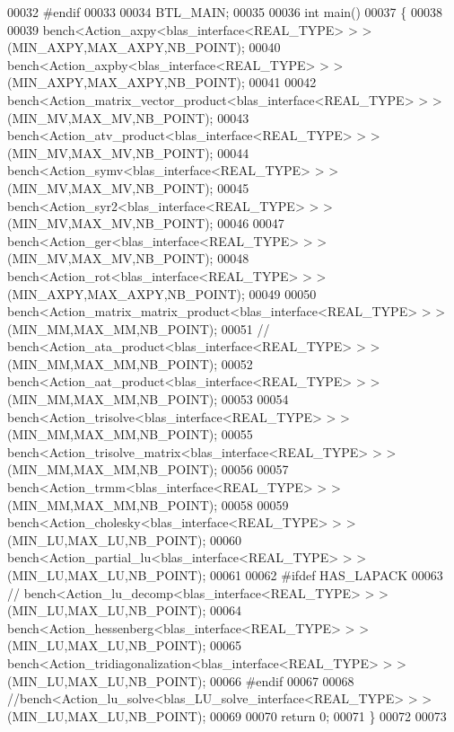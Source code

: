 \begin{DoxyCode}
00032 \textcolor{preprocessor}{#endif}
00033 
00034 BTL\_MAIN;
00035 
00036 \textcolor{keywordtype}{int} main()
00037 \{
00038 
00039   bench<Action\_axpy<blas\_interface<REAL\_TYPE> > >(MIN\_AXPY,MAX\_AXPY,NB\_POINT);
00040   bench<Action\_axpby<blas\_interface<REAL\_TYPE> > >(MIN\_AXPY,MAX\_AXPY,NB\_POINT);
00041 
00042   bench<Action\_matrix\_vector\_product<blas\_interface<REAL\_TYPE> > >(MIN\_MV,MAX\_MV,NB\_POINT);
00043   bench<Action\_atv\_product<blas\_interface<REAL\_TYPE> > >(MIN\_MV,MAX\_MV,NB\_POINT);
00044   bench<Action\_symv<blas\_interface<REAL\_TYPE> > >(MIN\_MV,MAX\_MV,NB\_POINT);
00045   bench<Action\_syr2<blas\_interface<REAL\_TYPE> > >(MIN\_MV,MAX\_MV,NB\_POINT);
00046 
00047   bench<Action\_ger<blas\_interface<REAL\_TYPE> > >(MIN\_MV,MAX\_MV,NB\_POINT);
00048   bench<Action\_rot<blas\_interface<REAL\_TYPE> > >(MIN\_AXPY,MAX\_AXPY,NB\_POINT);
00049 
00050   bench<Action\_matrix\_matrix\_product<blas\_interface<REAL\_TYPE> > >(MIN\_MM,MAX\_MM,NB\_POINT);
00051 \textcolor{comment}{//   bench<Action\_ata\_product<blas\_interface<REAL\_TYPE> > >(MIN\_MM,MAX\_MM,NB\_POINT);}
00052   bench<Action\_aat\_product<blas\_interface<REAL\_TYPE> > >(MIN\_MM,MAX\_MM,NB\_POINT);
00053 
00054   bench<Action\_trisolve<blas\_interface<REAL\_TYPE> > >(MIN\_MM,MAX\_MM,NB\_POINT);
00055   bench<Action\_trisolve\_matrix<blas\_interface<REAL\_TYPE> > >(MIN\_MM,MAX\_MM,NB\_POINT);
00056 
00057   bench<Action\_trmm<blas\_interface<REAL\_TYPE> > >(MIN\_MM,MAX\_MM,NB\_POINT);
00058 
00059   bench<Action\_cholesky<blas\_interface<REAL\_TYPE> > >(MIN\_LU,MAX\_LU,NB\_POINT);
00060   bench<Action\_partial\_lu<blas\_interface<REAL\_TYPE> > >(MIN\_LU,MAX\_LU,NB\_POINT);
00061 
00062 \textcolor{preprocessor}{  #ifdef HAS\_LAPACK}
00063 \textcolor{comment}{//   bench<Action\_lu\_decomp<blas\_interface<REAL\_TYPE> > >(MIN\_LU,MAX\_LU,NB\_POINT);}
00064   bench<Action\_hessenberg<blas\_interface<REAL\_TYPE> > >(MIN\_LU,MAX\_LU,NB\_POINT);
00065   bench<Action\_tridiagonalization<blas\_interface<REAL\_TYPE> > >(MIN\_LU,MAX\_LU,NB\_POINT);
00066 \textcolor{preprocessor}{  #endif}
00067 
00068   \textcolor{comment}{//bench<Action\_lu\_solve<blas\_LU\_solve\_interface<REAL\_TYPE> > >(MIN\_LU,MAX\_LU,NB\_POINT);}
00069 
00070   \textcolor{keywordflow}{return} 0;
00071 \}
00072 
00073 
\end{DoxyCode}
